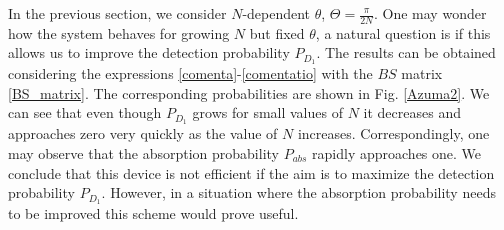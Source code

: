 \documentclass[12pt]{book}
\begin{document}
In the previous section, we consider $N$-dependent $\theta$, $\Theta = \frac{\pi}{2N}$. One may wonder how the system behaves for growing $N$ but fixed $\theta$, a natural question is if this allows us to improve the detection probability $P_{D_{1}}$. The results can be obtained considering the expressions \ref{comenta}-\ref{comentatio} with the $BS$ matrix \ref{BS_matrix}. The corresponding probabilities are shown in Fig. \ref{Azuma2}. We can see that even though $P_{D_{1}}$ grows for small values of $N$ it decreases and approaches zero very quickly as the value of $N$ increases. Correspondingly, one may observe that the absorption probability $P_{abs}$ rapidly approaches one. We conclude that this device is not efficient if the aim is to maximize the detection probability $P_{D_{1}}$. However, in a situation where the absorption probability needs to be improved this scheme would prove useful.
\end{document}
